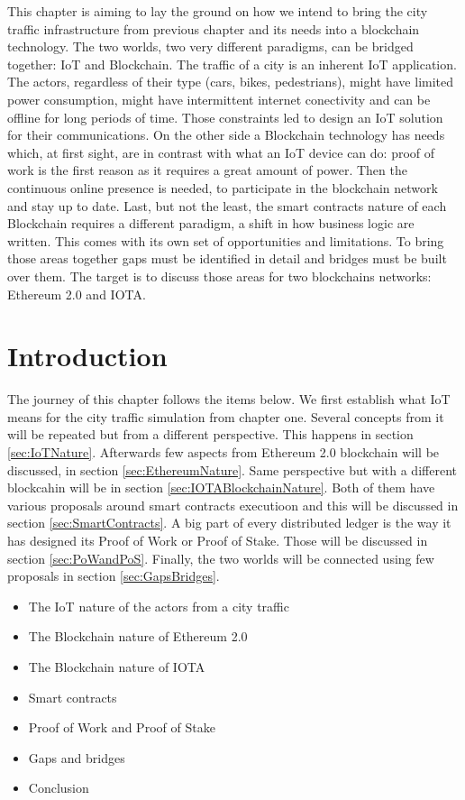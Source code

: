 \documentclass[a4paper,12pt,twoside]{book}
\begin{document}
    This chapter is aiming to lay the ground on how we intend to bring the city traffic infrastructure from previous chapter and its needs into a blockchain technology. The two worlds, two very different paradigms, can be bridged together: IoT and Blockchain. The traffic of a city is an inherent IoT application. The actors, regardless of their type (cars, bikes, pedestrians), might have limited power consumption, might have intermittent internet conectivity and can be offline for long periods of time. Those constraints led to design an IoT solution for their communications. On the other side a Blockchain technology has needs which, at first sight, are in contrast with what an IoT device can do: proof of work is the first reason as it requires a great amount of power. Then the continuous online presence is needed, to participate in the blockchain network and stay up to date. Last, but not the least, the smart contracts nature of each Blockchain requires a different paradigm, a shift in how business logic are written. This comes with its own set of opportunities and limitations. To bring those areas together gaps must be identified in detail and bridges must be built over them. The target is to discuss those areas for two blockchains networks: Ethereum 2.0 and IOTA.

\section{Introduction}
\label{sec:sec}

    The journey of this chapter follows the items below. We first establish what IoT means for the city traffic simulation from chapter one. Several concepts from it will be repeated but from a different perspective. This happens in section \ref{sec:IoTNature}. Afterwards few aspects from Ethereum 2.0 blockchain will be discussed, in section \ref{sec:EthereumNature}. Same perspective but with a different blockcahin will be in section \ref{sec:IOTABlockchainNature}. Both of them have various proposals around smart contracts executioon and this will be discussed in section \ref{sec:SmartContracts}. A big part of every distributed ledger is the way it has designed its Proof of Work or Proof of Stake. Those will be discussed in section \ref{sec:PoWandPoS}. Finally, the two worlds will be connected using few proposals in section \ref{sec:GapsBridges}.

    \begin{itemize}
        \item The IoT nature of the actors from a city traffic
        \item The Blockchain nature of Ethereum 2.0
        \item The Blockchain nature of IOTA
        \item Smart contracts
        \item Proof of Work and Proof of Stake
        \item Gaps and bridges
        \item Conclusion
    \end{itemize}
\end{document}
